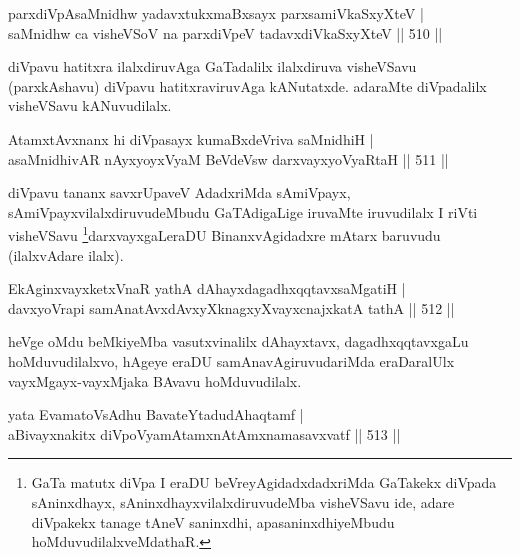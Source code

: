 
\begin{shl}
parxdiVpAsaMnidhw yadavxtukxmaBxsayx parxsamiVkaSxyXteV | \\
saMnidhw ca visheVSoV na parxdiVpeV tadavxdiVkaSxyXteV \hfill||  510 || 
\end{shl}

\begin{artha}
diVpavu hatitxra ilalxdiruvAga GaTadalilx ilalxdiruva visheVSavu (parxkAshavu) diVpavu hatitxraviruvAga kANutatxde. adaraMte diVpadalilx visheVSavu kANuvudilalx.
\end{artha}


\begin{shl}
AtamxtAvxnanx hi diVpasayx kumaBxdeVriva saMnidhiH | \\
asaMnidhivAR nAyxyoyxV\s yaM BeVdeV\s sw darxvayxyoVyaRtaH \hfill||  511 ||  
\end{shl}

\begin{artha}
diVpavu tananx savxrUpaveV AdadxriMda sAmiVpayx, sAmiVpayxvilalxdiruvudeMbudu GaTAdigaLige iruvaMte iruvudilalx I riVti visheVSavu \footnote{GaTa matutx diVpa I eraDU beVreyAgidadxdadxriMda GaTakekx diVpada sAninxdhayx, sAninxdhayxvilalxdiruvudeMba visheVSavu ide, adare diVpakekx tanage tAneV saninxdhi, apasaninxdhiyeMbudu hoMduvudilalxveMdathaR.}darxvayxgaLeraDU BinanxvAgidadxre mAtarx baruvudu (ilalxvAdare ilalx).
\end{artha}


\begin{shl}
EkAginxvayxketxVnaR yathA dAhayxdagadhxqqtavxsaMgatiH | \\
davxyoVrapi samAnatAvxdAvxyXknagxyXvayxcnajxkatA tathA \hfill||  512 ||  
\end{shl}

\begin{artha}
heVge oMdu beMkiyeMba vasutxvinalilx dAhayxtavx, dagadhxqqtavxgaLu hoMduvudilalxvo, hAgeye eraDU samAnavAgiruvudariMda eraDaralUlx vayxMgayx-vayxMjaka BAvavu hoMduvudilalx. 
\end{artha}

\begin{shl}
yata EvamatoV\s sAdhu BavateYtadudAhaqtamf | \\
aBivayxnakitx diVpoV\s yamAtamxnA\s \s tAmxnamasavxvatf \hfill||  513 ||  
\end{shl}

